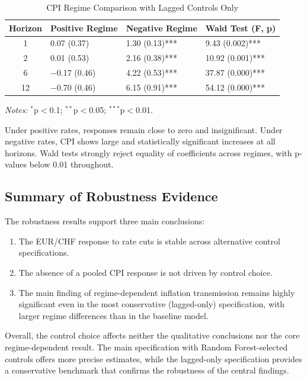 \documentclass[12pt,a4paper]{article}
\begin{document}
\begin{appendices}
\begin{table}[H]
	\centering
	\caption{CPI Regime Comparison with Lagged Controls Only} 
	\label{tab:robust_regime_cpi}
	\begin{tabular}{clll}
		\toprule
		Horizon & Positive Regime & Negative Regime & Wald Test (F, p) \\ 
		\midrule
		1  & 0.07 (0.37)   & 1.30 (0.13)*** & 9.43 (0.002)*** \\ 
		2  & 0.01 (0.53)   & 2.16 (0.38)*** & 10.92 (0.001)*** \\ 
		6  & $-$0.17 (0.46) & 4.22 (0.53)*** & 37.87 (0.000)*** \\ 
		12 & $-$0.70 (0.46) & 6.15 (0.91)*** & 54.12 (0.000)*** \\ 
		\bottomrule
	\end{tabular}
	\vspace{0.2cm}
	
	{\footnotesize
		\textit{Notes:} $^{*}$p$<$0.1; $^{**}$p$<$0.05; $^{***}$p$<$0.01.}
\end{table}

Under positive rates, responses remain close to zero and insignificant. Under negative rates, CPI shows large and statistically significant increases at all horizons. Wald tests strongly reject equality of coefficients across regimes, with p-values below 0.01 throughout.

\subsection{Summary of Robustness Evidence}

The robustness results support three main conclusions:
\begin{enumerate}
	\item The EUR/CHF response to rate cuts is stable across alternative control specifications.
	\item The absence of a pooled CPI response is not driven by control choice.
	\item The main finding of regime-dependent inflation transmission remains highly significant even in the most conservative (lagged-only) specification, with larger regime differences than in the baseline model.
\end{enumerate}

Overall, the control choice affects neither the qualitative conclusions nor the core regime-dependent result. The main specification with Random Forest-selected controls offers more precise estimates, while the lagged-only specification provides a conservative benchmark that confirms the robustness of the central findings.
	
\end{appendices}
\end{document}
